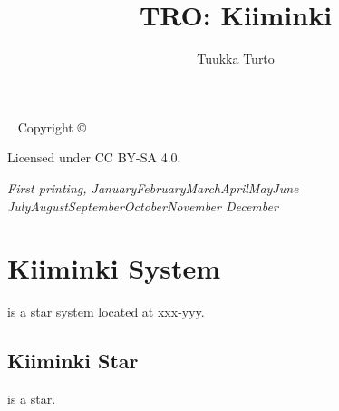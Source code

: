 \documentclass{tufte-book}
\title{TRO: Kiiminki}
\author{Tuukka Turto}
\newcommand{\monthyear}{%
  \ifcase\month\or January\or February\or March\or April\or May\or June\or
  July\or August\or September\or October\or November\or
  December\fi\space\number\year
}
\begin{document}
\frontmatter

\maketitle


\newpage
\begin{fullwidth}
~\vfill
\thispagestyle{empty}
\setlength{\parindent}{0pt}
\setlength{\parskip}{\baselineskip}
Copyright \copyright\ \the\year\ \thanklessauthor

\par{}

\par{}

\par Licensed under CC BY-SA 4.0.

\par\textit{First printing, \monthyear}
\end{fullwidth}

\setcounter{tocdepth}{2}
\tableofcontents

\mainmatter


\chapter{Kiiminki System}
\label{ch:kiiminki-system}

 is a star system located at xxx-yyy.

\section{Kiiminki Star}

 is a star.
\end{document}

